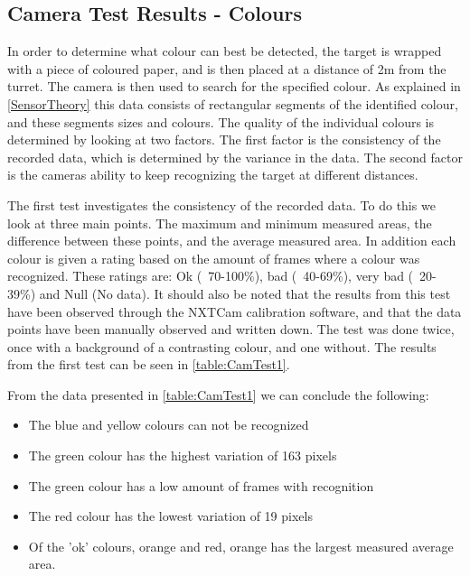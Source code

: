 
\subsection{Camera Test Results - Colours}\label{CamTestColours}
In order to determine what colour can best be detected, the target is wrapped
with a piece of coloured paper, and is then placed at a distance of 2m from the
turret. The camera is then used to search for the specified colour. As explained
in \autoref{SensorTheory} this data consists of rectangular segments of the
identified colour, and these segments sizes and colours. The quality of the
individual colours is determined by looking at two factors. The first factor is
the consistency of the recorded data, which is determined by the variance in the
data. The second factor is the cameras ability to keep recognizing the target
at different distances.\nl

The first test investigates the consistency of the recorded data. To do this we
look at three main points. The maximum and minimum measured areas, the difference
between these points, and the average measured area. In addition each colour is
given a rating based on the amount of frames where a colour was recognized.
These ratings are: Ok (~70-100\%), bad (~40-69\%), very bad (~20-39\%) and Null
(No data). It should also be noted that the results from this test have been
observed through the NXTCam calibration software, and that the data points have
been manually observed and written down. The test was done twice, once with a
background of a contrasting colour, and one without. The results from the first
test can be seen in \autoref{table:CamTest1}.


From the data presented in \autoref{table:CamTest1} we can conclude the
following:
\begin{itemize}
  \item The blue and yellow colours can not be recognized
  \item The green colour has the highest variation of 163 pixels
  \item The green colour has a low amount of frames with recognition
  \item The red colour has the lowest variation of 19 pixels
  \item Of the 'ok' colours, orange and red, orange has the largest measured
  average area.
\end{itemize} 


